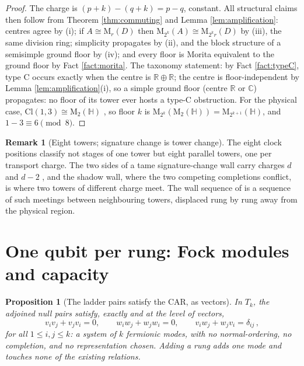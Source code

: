 \documentclass[11pt]{article}
\newtheorem{proposition}[theorem]{Proposition}
\theoremstyle{definition}
\newtheorem{remark}[theorem]{Remark}
\newcommand{\Cl}{\mathrm{Cl}}
\newcommand{\R}{\mathbb{R}}
\newcommand{\C}{\mathbb{C}}
\newcommand{\HH}{\mathbb{H}}
\newcommand{\Mat}{\mathrm{M}}
\begin{document}
\begin{proof}
The charge is $(p{+}k) - (q{+}k) = p - q$, constant. All structural claims then follow from Theorem \ref{thm:commuting} and Lemma \ref{lem:amplification}: centres agree by (i); if $A \cong \Mat_r(D)$ then $\Mat_{2^k}(A) \cong \Mat_{2^k r}(D)$ by (iii), the same division ring; simplicity propagates by (ii), and the block structure of a semisimple ground floor by (iv); and every floor is Morita equivalent to the ground floor by Fact \ref{fact:morita}. The taxonomy statement: by Fact \ref{fact:typeC}, type C occurs exactly when the centre is $\R \oplus \R$; the centre is floor-independent by Lemma \ref{lem:amplification}(i), so a simple ground floor (centre $\R$ or $\C$) propagates: no floor of its tower ever hosts a type-C obstruction. For the physical case, $\Cl(1,3) \cong \Mat_2(\HH)$ \cite{Porteous1995}, so floor $k$ is $\Mat_{2^k}(\Mat_2(\HH)) = \Mat_{2^{k+1}}(\HH)$, and $1 - 3 \equiv 6 \pmod 8$.
\end{proof}

\begin{remark}[Eight towers; signature change is tower change]\label{rem:eighttowers}
The eight clock positions classify not stages of one tower but eight parallel towers, one per transport charge. The two sides of a tame signature-change wall carry charges $d$ and $d - 2$ \cite[\S 7.2]{ButlerT4}, and the shadow wall, where the two competing completions conflict, is where two towers of different charge meet. The wall sequence of \cite[Cor.~5.5]{ButlerT4} is a sequence of such meetings between neighbouring towers, displaced rung by rung away from the physical region.
\end{remark}

\section{One qubit per rung: Fock modules and capacity}\label{sec:fock}

\begin{proposition}[The ladder pairs satisfy the CAR, as vectors]\label{prop:car}
In $T_k$, the adjoined null pairs satisfy, exactly and at the level of vectors,
\[
v_i v_j + v_j v_i = 0, \qquad w_i w_j + w_j w_i = 0, \qquad v_i w_j + w_j v_i = \delta_{ij}\,,
\]
for all $1 \leq i, j \leq k$: a system of $k$ fermionic modes, with no normal-ordering, no completion, and no representation chosen. Adding a rung adds one mode and touches none of the existing relations.
\end{proposition}
\end{document}
